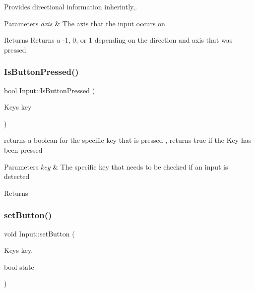 Provides directional information inherintly,. 


\begin{DoxyParams}{Parameters}
{\em axis} & The axis that the input occurs on \\
\hline
\end{DoxyParams}
\begin{DoxyReturn}{Returns}
Returns a -\/1, 0, or 1 depending on the direction and axis that was pressed 
\end{DoxyReturn}
\mbox{\label{class_input_abb8551549ffe7b1474aca91ce3509d57}} 
\subsubsection{\texorpdfstring{Is\+Button\+Pressed()}{IsButtonPressed()}}
{\footnotesize\ttfamily bool Input\+::\+Is\+Button\+Pressed (\begin{DoxyParamCaption}\item[{Keys}]{key }\end{DoxyParamCaption})\hspace{0.3cm}{\ttfamily [static]}}



returns a boolean for the specific key that is pressed , returns true if the Key has been pressed 


\begin{DoxyParams}{Parameters}
{\em key} & The specific key that needs to be checked if an input is detected \\
\hline
\end{DoxyParams}
\begin{DoxyReturn}{Returns}

\end{DoxyReturn}
\mbox{\label{class_input_a851f7b43b30dcf7166af7c548d21316f}} 
\subsubsection{\texorpdfstring{set\+Button()}{setButton()}}
{\footnotesize\ttfamily void Input\+::set\+Button (\begin{DoxyParamCaption}\item[{Keys}]{key,  }\item[{bool}]{state }\end{DoxyParamCaption})\hspace{0.3cm}{\ttfamily [static]}}



